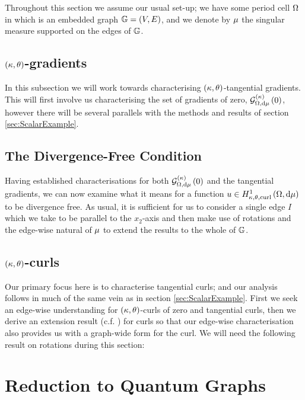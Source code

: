 Throughout this section we assume our usual set-up; we have some period cell $\Omega$ in which is an embedded graph $\mathbb{G}=\left( V,E \right)$, and we denote by $\mu$ the singular measure supported on the edges of $\mathbb{G}$.

\subsection{$\left( \kappa,\theta \right)$-gradients} \label{sec:ktGradients}
In this subsection we will work towards characterising $\left( \kappa,\theta \right)$-tangential gradients.
This will first involve us characterising the set of gradients of zero, $\mathcal{G}_{ \Omega, \mathrm{d}\mu}^{(\kappa)}\left( 0 \right)$, however there will be several parallels with the methods and results of section \ref{sec:ScalarExample}.

\subsection{The Divergence-Free Condition} \label{sec:ktDivFree}
Having established characterisations for both $\mathcal{G}_{ \Omega, \mathrm{d}\mu}^{(\kappa)}\left( 0 \right)$ and the tangential gradients, we can now examine what it means for a function $u\in H^1_{\kappa,\theta,\mathrm{curl}}\left( \Omega, \mathrm{d}\mu \right)$ to be divergence free.
As usual, it is sufficient for us to consider a single edge $I$ which we take to be parallel to the $x_2$-axis and then make use of rotations and the edge-wise natural of $\mu$ to extend the results to the whole of $\mathbb{G}$. \newline

\subsection{$\left( \kappa,\theta \right)$-curls} \label{sec:ktCurls}
Our primary focus here is to characterise tangential curls; and our analysis follows in much of the same vein as in section \ref{sec:ScalarExample}.
First we seek an edge-wise understanding for $\left( \kappa,\theta \right)$-curls of zero and tangential curls, then we derive an extension result (c.f. ) for curls so that our edge-wise characterisation also provides us with a graph-wide form for the curl.
We will need the following result on rotations during this section:

\section{Reduction to Quantum Graphs} \label{sec:CurlReductionToQG}

